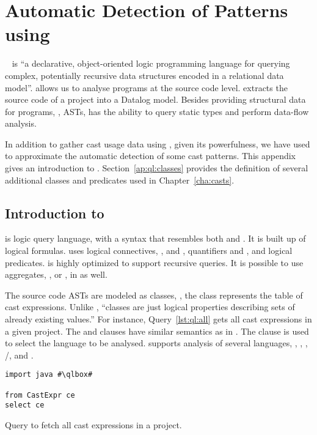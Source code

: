 \chapter{Automatic Detection of Patterns using \ql{}}
\label{ap:ql}

\ql{}~\citep{avgustinovQLObjectorientedQueries2016} is ``a declarative, object-oriented logic programming language for querying complex,
potentially recursive data structures encoded in a relational data
model''.
\ql{} allows us to analyse programs at the source code level.
\ql{} extracts the source code of a project into a Data\-log model.
Besides providing structural data for programs, \ie{}, ASTs,
\ql{} has the ability to query static types and perform data-flow analysis.

In addition to gather cast usage data using \ql{}, given its powerfulness,
we have used \ql{} to approximate the automatic detection of some cast patterns.
This appendix gives an introduction to \ql{}.
Section~\ref{ap:ql:classes} provides the definition of several additional classes and predicates used in Chapter~\ref{cha:casts}.

\section{Introduction to \ql{}}

\ql{} is logic query language,
with a syntax that resembles both \sql{} and \java{}.
It is built up of logical formulas.
\ql{} uses logical connectives, \eg{},  and ,
quantifiers  and , and logical predicates.
\ql{} is highly optimized to support recursive queries.
It is possible to use aggregates, \eg{},  or , in \ql{} as well.

The source code ASTs are modeled as \ql{} classes,
\eg{}, the  class represents the table of cast expressions.
Unlike \java{},
\ql{} ``classes are just logical properties describing sets of already existing values.''%
For instance, Query~\ref{lst:ql:all} gets all cast expressions in a given project.
The  and  clauses have similar semantics as in \sql{}.
The  clause is used to select the language to be analysed.
\ql{} supports analysis of several languages,
\eg{}, \javascript{}, \python{}, \cc{}/\cpp{}, and \csharp{}.

\begin{listing}
\begin{verbatim}
import java #\qlbox#

from CastExpr ce
select ce
\end{verbatim}
\caption{Query to fetch all cast expressions in a project.}
\label{lst:ql:all}
\end{listing}

